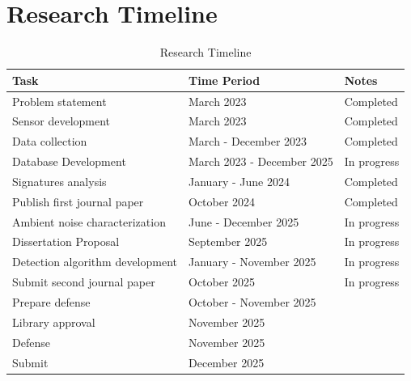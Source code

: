 \chapter{Research Timeline}

\begin{table}[!htbp]
    \caption{Research Timeline \label{tab:timeline}}
    \centering
    \small
    \begin{tabularx}{\textwidth}{X X X}
        \toprule
        \textbf{Task} & \textbf{Time Period} & \textbf{Notes} \\ \midrule
        Problem statement & March 2023 & Completed \\
        Sensor development & March 2023 & Completed \\
        Data collection & March - December 2023 & Completed \\
        Database Development & March 2023 - December 2025 & In progress  \\
        Signatures analysis & January - June 2024 & Completed \\
        Publish first journal paper & October 2024 & Completed \\
        Ambient noise characterization & June - December 2025 & In progress \\
        Dissertation Proposal & September 2025 & In progress \\
        Detection algorithm development & January - November 2025 & In progress \\
        Submit second journal paper & October 2025 & In progress \\
        Prepare defense & October - November 2025 &  \\
        Library approval & November 2025 & \\
        Defense & November 2025 &  \\
        Submit & December 2025 & \\
    \end{tabularx}
\end{table}